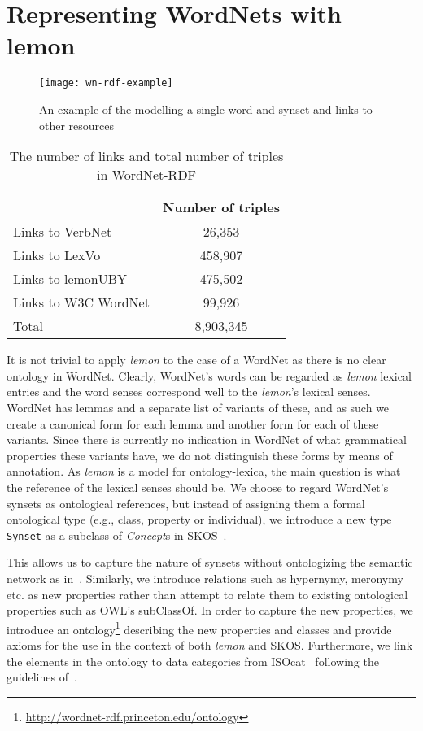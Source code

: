 \documentclass[10pt, a4paper]{article}
\newcommand{\lemon}[0]{\emph{lemon}}
\begin{document}
\section{Representing WordNets with lemon}

\begin{figure}
    \texttt{[image: wn-rdf-example]}
    \caption{An example of the modelling a single word and synset and links to
        other resources\label{modelling_example}}
\end{figure}



\begin{table}
  \begin{tabular}{p{50mm}|c}
     & Number of triples \\
    \hline
    Links to VerbNet & 26,353 \\
    Links to LexVo & 458,907 \\
    Links to lemonUBY & 475,502 \\
    Links to W3C WordNet & 99,926 \\
    \hline
    Total & 8,903,345 \\
  \end{tabular}
  \caption{The number of links and total number of triples in
      WordNet-RDF\label{triple_counts}}
\end{table}

It is not trivial to apply \lemon{} to the case of a WordNet as there is no
clear ontology in WordNet.
Clearly, WordNet's 
words can be regarded as \lemon{} lexical entries and the word senses correspond
well to the \lemon{}'s lexical senses. WordNet has lemmas and a separate list of
variants of these, and as such we create a canonical form for each lemma and another 
form for each of these variants. Since there is currently no indication in
WordNet of what grammatical properties these variants have, we do not distinguish
these forms by means of annotation. As \lemon{} is a model for
ontology-lexica, the main question is what the reference of the lexical senses should be.
We choose to regard WordNet's synsets as ontological references, but instead of assigning them a formal ontological type (e.g.,
class, property or individual), we introduce a new type {\tt Synset} as a subclass of \emph{Concept}s in SKOS~\cite{miles2007skos}.

This allows us to capture the nature of synsets without
ontologizing the semantic network as in~\cite{gangemi2003ontowordnet}.
Similarly, we introduce relations such as hypernymy, meronymy etc. as new
properties rather than attempt to relate them to existing ontological
properties such as OWL's subClassOf. In order to capture the new properties, we
introduce an ontology\footnote{\url{http://wordnet-rdf.princeton.edu/ontology}}
describing the new properties and classes and provide
axioms for the use in the context of both \lemon{} and SKOS. Furthermore, we
link the elements in the ontology to data categories from
ISOcat~\cite{kemps2008isocat} following the guidelines
of~\cite{windhouwer2012linking}.
\end{document}
